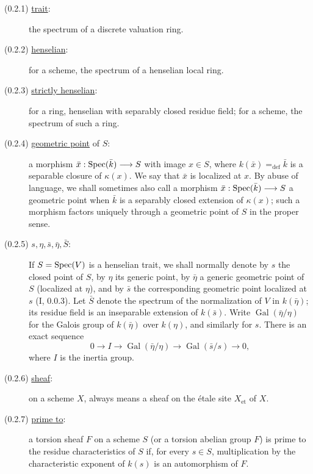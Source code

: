 \begin{description}
\item[(0.2.1) \underline{trait}:]
the spectrum of a discrete valuation ring.

\item[(0.2.2) \underline{henselian}:]
for a scheme, the spectrum of a henselian local ring.

\item[(0.2.3) \underline{strictly henselian}:]
for a ring, henselian with separably closed residue field; for a scheme,
the spectrum of such a ring.

\item[(0.2.4) \underline{geometric point} of $S$:]
a morphism $\bar x:\operatorname{Spec}(\bar k)\longrightarrow S$ with image $x\in S$,
where $k(\bar x)=_{\mathrm{def}}\bar k$ is a separable closure of
$\kappa(x)$.  We say that $\bar x$ is localized at $x$.  By abuse of
language, we shall sometimes also call a morphism
$\bar x:\operatorname{Spec}(\bar k)\longrightarrow S$ a geometric point when $\bar k$
is a separably closed extension of $\kappa(x)$; such a morphism factors
uniquely through a geometric point of $S$ in the proper sense.

\item[(0.2.5) $s,\eta,\bar s,\bar\eta,\bar S$:]
If $S=\operatorname{Spec}(V)$ is a henselian trait, we shall normally denote by $s$
the closed point of $S$, by $\eta$ its generic point, by $\bar\eta$ a
generic geometric point of $S$ (localized at $\eta$), and by $\bar s$
the corresponding geometric point localized at $s$ (I, 0.0.3).  Let
$\bar S$ denote the spectrum of the normalization of $V$ in
$k(\bar\eta)$; its residue field is an inseparable extension of
$k(\bar s)$.  Write $\operatorname{Gal}(\bar\eta/\eta)$ for the Galois
group of $k(\bar\eta)$ over $k(\eta)$, and similarly for $s$.  There is
an exact sequence
\begin{equation*}
0\longrightarrow I\longrightarrow
\operatorname{Gal}(\bar\eta/\eta)\longrightarrow
\operatorname{Gal}(\bar s/s)\longrightarrow0,
\end{equation*}
where $I$ is the inertia group.

\item[(0.2.6) \underline{sheaf}:]
on a scheme $X$, always means a sheaf on the \'{e}tale site
$X_{\mathrm{et}}$ of $X$.

\item[(0.2.7) \underline{prime to}:]
a torsion sheaf $F$ on a scheme $S$ (or a torsion abelian group $F$) is
prime to the residue characteristics of $S$ if, for every $s\in S$,
multiplication by the characteristic exponent of $k(s)$ is an
automorphism of $F$.
\end{description}
